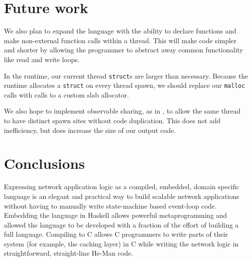 \documentclass[preprint]{sigplanconf}
\renewcommand{\t}{\texttt}
\begin{document}


\section{Future work}

We also plan to expand the language with the ability to declare functions and
make non-external function calls within a thread. This will make code simpler
and shorter by allowing the programmer to abstract away common functionality
like read and write loops.

In the runtime, our current thread \t{struct}s are larger than necessary.
Because the runtime allocates a \t{struct} on every thread spawn, we should
replace our \t{malloc} calls with calls to a custom slab allocator.

We also hope to implement observable sharing, as in \cite{Gill}, to allow the
same thread to have distinct spawn sites without code duplication. This does not
add inefficiency, but does increase the size of our output code. 

\section{Conclusions}
Expressing network application logic as a compiled, embedded, domain
specific language is an elegant and practical way to build scalable
network applications without having to manually write state-machine
based event-loop code. Embedding the language in Haskell allows
powerful metaprogramming and allowed the language to be developed with
a fraction of the effort of building a full language. Compiling to C
allows C programmers to write parts of their system (for example, the
caching layer) in C while writing the network logic in
straightforward, straight-line He-Man code.


{}

\end{document}
